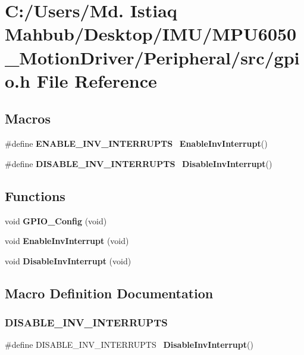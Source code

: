 \section{C\+:/\+Users/\+Md. Istiaq Mahbub/\+Desktop/\+I\+M\+U/\+M\+P\+U6050\+\_\+\+Motion\+Driver/\+Peripheral/src/gpio.h File Reference}
\label{gpio_8h}
\subsection*{Macros}
\begin{DoxyCompactItemize}
\item 
\#define \textbf{ E\+N\+A\+B\+L\+E\+\_\+\+I\+N\+V\+\_\+\+I\+N\+T\+E\+R\+R\+U\+P\+TS}~\textbf{ Enable\+Inv\+Interrupt}()
\item 
\#define \textbf{ D\+I\+S\+A\+B\+L\+E\+\_\+\+I\+N\+V\+\_\+\+I\+N\+T\+E\+R\+R\+U\+P\+TS}~\textbf{ Disable\+Inv\+Interrupt}()
\end{DoxyCompactItemize}
\subsection*{Functions}
\begin{DoxyCompactItemize}
\item 
void \textbf{ G\+P\+I\+O\+\_\+\+Config} (void)
\item 
void \textbf{ Enable\+Inv\+Interrupt} (void)
\item 
void \textbf{ Disable\+Inv\+Interrupt} (void)
\end{DoxyCompactItemize}


\subsection{Macro Definition Documentation}
\mbox{\label{gpio_8h_a0bf55783d7d8def8e5c008aadcc0e411}} 
\subsubsection{D\+I\+S\+A\+B\+L\+E\+\_\+\+I\+N\+V\+\_\+\+I\+N\+T\+E\+R\+R\+U\+P\+TS}
{\footnotesize\ttfamily \#define D\+I\+S\+A\+B\+L\+E\+\_\+\+I\+N\+V\+\_\+\+I\+N\+T\+E\+R\+R\+U\+P\+TS~\textbf{ Disable\+Inv\+Interrupt}()}




